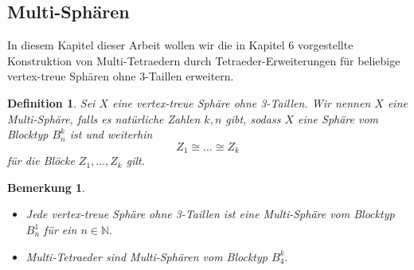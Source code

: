 \documentclass[12pt,titlepage,twoside,cleardoublepage]{article}
\theoremstyle{nummermitklammern}
\newtheorem{definition}[temp]{Definition}
\newtheorem{bemerkung}[temp]{Bemerkung}
\newtheorem{definition}[zahl]{Definition}
\newtheorem{bemerkung}[zahl]{Bemerkung}
\numberwithin{equation}{section}
\begin{document}
\subsection{Multi-Sphären}
In diesem Kapitel dieser Arbeit wollen wir die in Kapitel 6 vorgestellte Konstruktion von Multi-Tetraedern durch Tetraeder-Erweiterungen für beliebige vertex-treue Sphären ohne 3-Taillen erweitern.   
\begin{definition}
Sei $X$ eine vertex-treue Sphäre ohne 3-Taillen. Wir nennen $X$ eine \emph{Multi-Sphäre}, falls es natürliche Zahlen $k,n$ gibt, sodass $X$ eine Sphäre vom Blocktyp $B_n^k$ ist und weiterhin
\[
Z_1\cong \ldots\cong Z_k
\]
für die Blöcke $Z_1,\ldots,Z_k$ gilt. 
\end{definition}
\begin{bemerkung}
\begin{itemize}
\item Jede vertex-treue Sphäre ohne 3-Taillen ist eine Multi-Sphäre vom Blocktyp $B_n^1$ für ein $n\in \mathbb{N}.$
\item Multi-Tetraeder sind Multi-Sphären vom Blocktyp $B_4^k.$
\end{itemize}
\end{bemerkung}
\end{document}
